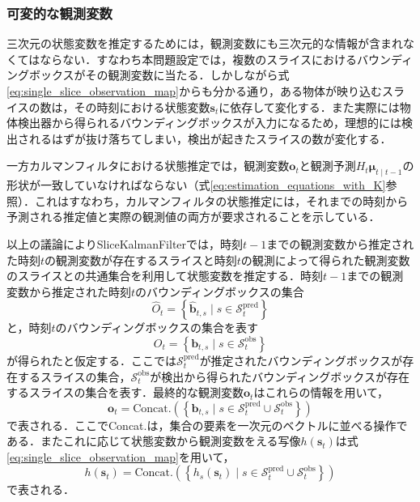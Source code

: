             \subsubsection{可変的な観測変数}

            三次元の状態変数を推定するためには，観測変数にも三次元的な情報が含まれなくてはならない．すなわち本問題設定では，複数のスライスにおけるバウンディングボックスがその観測変数に当たる．しかしながら式\ref{eq:single_slice_observation_map}からも分かる通り，ある物体が映り込むスライスの数は，その時刻における状態変数$\bm{s}_t$に依存して変化する．また実際には物体検出器から得られるバウンディングボックスが入力になるため，理想的には検出されるはずが抜け落ちてしまい，検出が起きたスライスの数が変化する．

            一方カルマンフィルタにおける状態推定では，観測変数$\bm{o}_t$と観測予測$H_t\bm{\mu}_{t \mid t-1}$の形状が一致していなければならない（式\ref{eq:estimation_equations_with_K}参照）．これはすなわち，カルマンフィルタの状態推定には，それまでの時刻から予測される推定値と実際の観測値の両方が要求されることを示している．

            以上の議論によりSliceKalmanFilterでは，時刻$t-1$までの観測変数から推定された時刻$t$の観測変数が存在するスライスと時刻$t$の観測によって得られた観測変数のスライスとの共通集合を利用して状態変数を推定する．時刻$t-1$までの観測変数から推定された時刻$t$のバウンディングボックスの集合
            \begin{equation}
                \label{eq:sliced_bounding_boxes}
                \hat{O}_t = \left\{\hat{\bm{b}}_{t, s} \mid  s \in \mathcal{S}_t^{\text{pred}}\right\}
            \end{equation}
            と，時刻$t$のバウンディングボックスの集合を表す
            \begin{equation}
                \label{eq:observed_bounding_boxes}
                O_t = \left\{\bm{b}_{t,s} \mid s \in \mathcal{S}_t^{\text{obs}}\right\}
            \end{equation}
            が得られたと仮定する．ここでは$\mathcal{S}_t^{\text{pred}}$が推定されたバウンディングボックスが存在するスライスの集合，$\mathcal{S}_t^{\text{obs}}$が検出から得られたバウンディングボックスが存在するスライスの集合を表す．最終的な観測変数$\bm{o}_t$はこれらの情報を用いて，
            \begin{equation}
                \label{eq:skf_observation}
                \bm{o}_t = \text{Concat.}\left(\left\{\bm{b}_{t,s} \mid s \in \mathcal{S}_t^{\text{pred}} \cup \mathcal{S}_t^{\text{obs}}\right\}\right)
            \end{equation}
            で表される．ここでConcat.は，集合の要素を一次元のベクトルに並べる操作である．またこれに応じて状態変数から観測変数をえる写像$h(\bm{s}_t)$は式\ref{eq:single_slice_observation_map}を用いて，
            \begin{equation}
                \label{eq:skf_observation_map}
                h(\bm{s}_t) = \text{Concat.}\left(\left\{h_s(\bm{s}_t) \mid s \in \mathcal{S}_t^{\text{pred}} \cup \mathcal{S}_t^{\text{obs}}\right\}\right)
            \end{equation}
            で表される．

